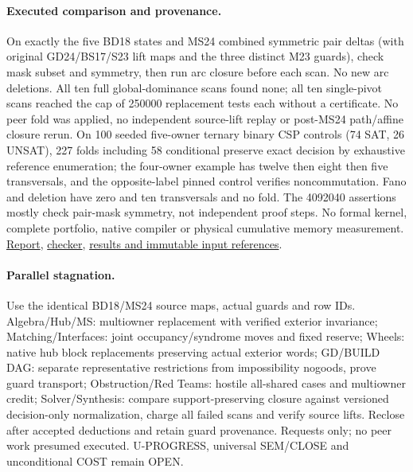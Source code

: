 \documentclass[11pt]{article}
\begin{document}
\paragraph{Executed comparison and provenance.}
On exactly the five BD18 states and MS24 combined symmetric pair deltas (with original GD24/BS17/S23 lift maps and the three distinct M23 guards), check mask subset and symmetry, then run arc closure before each scan. No new arc deletions. All ten full global-dominance scans found none; all ten single-pivot scans reached the cap of 250000 replacement tests each without a certificate. No peer fold was applied, no independent source-lift replay or post-MS24 path/affine closure rerun. On 100 seeded five-owner ternary binary CSP controls (74 SAT, 26 UNSAT), 227 folds including 58 conditional preserve exact decision by exhaustive reference enumeration; the four-owner example has twelve then eight then five transversals, and the opposite-label pinned control verifies noncommutation. Fano and deletion have zero and ten transversals and no fold. The 4092040 assertions mostly check pair-mask symmetry, not independent proof steps. No formal kernel, complete portfolio, native compiler or physical cumulative memory measurement. \href{https://github.com/j15marti/pnp/commit/2cc714cf9bca3ac152eb36b47d27f1d77044b147}{Report}, \href{https://github.com/j15marti/pnp/commit/9f4ff3c421300730cff9837610414fd457c001b7}{checker}, \href{https://github.com/j15marti/pnp/commit/5f38a442dd8e5d418e1eb80c5ffa7c0114dd63aa}{results and immutable input references}.
\paragraph{Parallel stagnation.}
Use the identical BD18/MS24 source maps, actual guards and row IDs. Algebra/Hub/MS: multiowner replacement with verified exterior invariance; Matching/Interfaces: joint occupancy/syndrome moves and fixed reserve; Wheels: native hub block replacements preserving actual exterior words; GD/BUILD DAG: separate representative restrictions from impossibility nogoods, prove guard transport; Obstruction/Red Teams: hostile all-shared cases and multiowner credit; Solver/Synthesis: compare support-preserving closure against versioned decision-only normalization, charge all failed scans and verify source lifts. Reclose after accepted deductions and retain guard provenance. Requests only; no peer work presumed executed. U-PROGRESS, universal SEM/CLOSE and unconditional COST remain OPEN.
\end{document}
